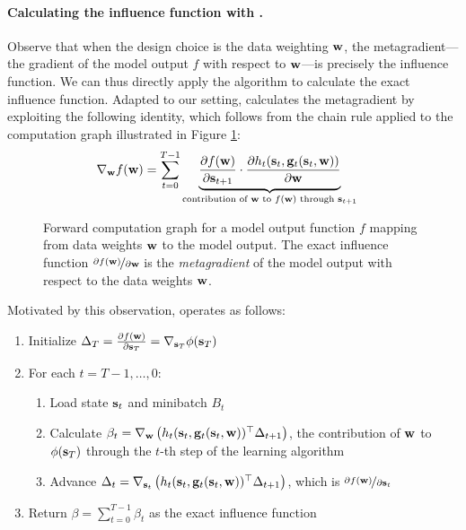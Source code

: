 \paragraph{Calculating the influence function with \replay{}.}
Observe that when the design choice is the data weighting $\mathbf{w}$,
the metagradient---the gradient of the model output $f$ with respect to
$\mathbf{w}$---is precisely the influence function.
We can thus directly apply the \replay{} algorithm
\citep{engstrom2025optimizing}
to calculate the exact
influence function.
Adapted to our setting, \replay{} calculates the metagradient by
exploiting the following identity, which follows from the chain rule
applied to the computation graph illustrated in Figure
\ref{fig:computation_graph}:
\begin{align}
  \nabla_{\mathbf{w}} f(\mathbf{w})
  &= \sum_{t=0}^{T-1} \underbrace{
    \frac{\partial f(\mathbf{w})}{\partial \mathbf{s}_{t+1}} \cdot
    \frac{\partial h_t(\mathbf{s}_{t}, \mathbf{g}_t(\mathbf{s}_{t}, \mathbf{w}))}{\partial \mathbf{w}}
  }_{\text{contribution of $\mathbf{w}$ to $f(\mathbf{w})$ through $\mathbf{s}_{t+1}$}}
  \label{eq:replay_meta_grad}
\end{align}

\begin{figure}[t]
  \centering
  
  \caption{Forward computation graph for a model output function $f$
    mapping from data weights $\mathbf{w}$ to the model output.
    The exact influence function $\nicefrac{\partial f(\mathbf{w})}{\partial \mathbf{w}}$
    is the {\em metagradient} of the model output with respect to the
  data weights $\mathbf{w}$.}
  \label{fig:computation_graph}
\end{figure}

Motivated by this observation, \replay{} operates as follows:
\begin{enumerate}
  \item Initialize $\Delta_T = \frac{\partial f(\mathbf{w})}{\partial
    \mathbf{s}_{T}} = \nabla_{\mathbf{s}_{T}} \phi(\mathbf{s}_{T})$
  \item For each $t = T-1, \ldots, 0$:
    \begin{enumerate}
      \item Load state $\mathbf{s}_{t}$ and minibatch $B_t$
      \item Calculate $\beta_t = \nabla_{\mathbf{w}} \left(h_t(\mathbf{s}_{t},
        \mathbf{g}_t(\mathbf{s}_{t}, \mathbf{w}))^\top \Delta_{t+1}\right)$,
        the contribution of $\mathbf{w}$ to $\phi(\mathbf{s}_{T})$ through the
        $t$-th step of the learning algorithm
      \item Advance $\Delta_t = \nabla_{\mathbf{s}_{t}} \left(h_t(\mathbf{s}_{t},
        \mathbf{g}_t(\mathbf{s}_{t}, \mathbf{w}))^\top \Delta_{t+1}\right)$,
        which is $\nicefrac{\partial f(\mathbf{w})}{\partial \mathbf{s}_{t}}$
    \end{enumerate}
  \item Return $\beta = \sum_{t=0}^{T-1} \beta_t$ as the exact
    influence function
\end{enumerate}

